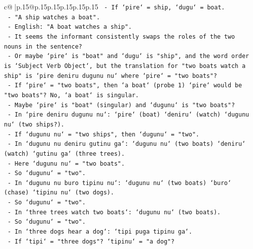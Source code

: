 \documentclass{article}
\begin{document}
{\begin{supertabular}{c@{$\;$}|p{.15\linewidth}@{}p{.15\linewidth}p{.15\linewidth}p{.15\linewidth}p{.15\linewidth}p{.15\linewidth}}
{{{\texttt{                             {-} If `pire` = ship, `dugu` = boat.} \\
\texttt{                             {-} "A ship watches a boat".} \\
\texttt{                             {-} English: "A boat watches a ship".} \\
\texttt{                             {-} It seems the informant consistently swaps the roles of the two nouns in the sentence?} \\
\texttt{                             {-} Or maybe `pire` is "boat" and `dugu` is "ship", and the word order is `Subject Verb Object`, but the translation for "two boats watch a ship" is `pire deniru dugunu nu` where `pire` = "two boats"?} \\
\texttt{                             {-} If `pire` = "two boats", then `a boat` (probe 1) `pire` would be "two boats"? No, `a boat` is singular.} \\
\texttt{                             {-} Maybe `pire` is "boat" (singular) and `dugunu` is "two boats"?} \\
\texttt{                             {-} In `pire deniru dugunu nu`: `pire` (boat) `deniru` (watch) `dugunu nu` (two ships?).} \\
\texttt{                             {-} If `dugunu nu` = "two ships", then `dugunu` = "two".} \\
\texttt{                             {-} In `dugunu nu deniru gutinu ga`: `dugunu nu` (two boats) `deniru` (watch) `gutinu ga` (three trees).} \\
\texttt{                             {-} Here `dugunu nu` = "two boats".} \\
\texttt{                             {-} So `dugunu` = "two".} \\
\texttt{                             {-} In `dugunu nu buro tipinu nu`: `dugunu nu` (two boats) `buro` (chase) `tipinu nu` (two dogs).} \\
\texttt{                             {-} So `dugunu` = "two".} \\
\texttt{                             {-} In `three trees watch two boats`: `dugunu nu` (two boats).} \\
\texttt{                             {-} So `dugunu` = "two".} \\
\texttt{                             {-} In `three dogs hear a dog`: `tipi puga tipinu ga`.} \\
\texttt{                               {-} If `tipi` = "three dogs"? `tipinu` = "a dog"?} \\
}}}
\end{supertabular}}
\end{document}
